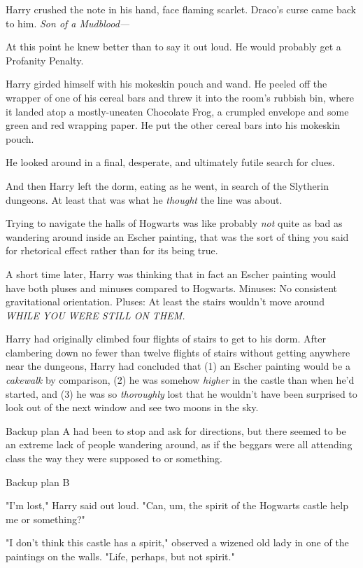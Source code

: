 Harry crushed the note in his hand, face flaming scarlet. Draco's curse came
back to him. \emph{Son of a Mudblood---}

At this point he knew better than to say it out loud. He would probably get a
Profanity Penalty.

Harry girded himself with his mokeskin pouch and wand. He peeled off the
wrapper of one of his cereal bars and threw it into the room's rubbish bin, where
it landed atop a mostly-uneaten Chocolate Frog, a crumpled envelope and some
green and red wrapping paper. He put the other cereal bars into his mokeskin
pouch.

He looked around in a final, desperate, and ultimately futile search for clues.

And then Harry left the dorm, eating as he went, in search of the Slytherin
dungeons. At least that was what he \emph{thought} the line was about.

Trying to navigate the halls of Hogwarts was like{\el} probably \emph{not}
quite as bad as wandering around inside an Escher painting, that was the sort
of thing you said for rhetorical effect rather than for its being true.

A short time later, Harry was thinking that in fact an Escher painting would
have both pluses and minuses compared to Hogwarts. Minuses: No consistent
gravitational orientation. Pluses: At least the stairs wouldn't move
around \emph{WHILE YOU WERE STILL ON THEM.}

Harry had originally climbed four flights of stairs to get to his dorm. After
clambering down no fewer than twelve flights of stairs without getting anywhere
near the dungeons, Harry had concluded that (1) an Escher painting would be a
\emph{cakewalk} by comparison, (2) he was somehow \emph{higher} in the castle
than when he'd started, and (3) he was so \emph{thoroughly} lost that he
wouldn't have been surprised to look out of the next window and see two moons
in the sky.

Backup plan A had been to stop and ask for directions, but there seemed to be
an extreme lack of people wandering around, as if the beggars were all
attending class the way they were supposed to or something.

Backup plan B{\el}

"I'm lost," Harry said out loud. "Can, um, the spirit of the Hogwarts castle
help me or something?"

"I don't think this castle has a spirit," observed a wizened old lady in one of
the paintings on the walls. "Life, perhaps, but not spirit."

